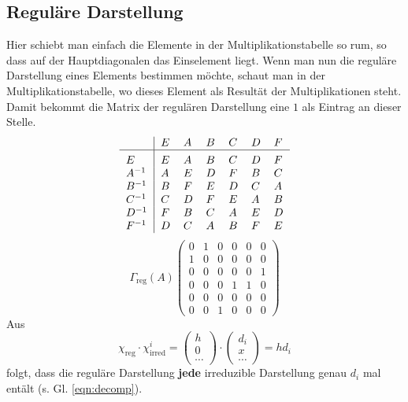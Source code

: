 \documentclass[
  captions=tableheading,  %
  titlepage=firstiscover, %
]{scrartcl}
\begin{document}
\subsection{Reguläre Darstellung}
Hier schiebt man einfach die Elemente in der Multiplikationstabelle so rum, so dass 
auf der Hauptdiagonalen das Einselement liegt. 
Wenn man nun die reguläre Darstellung eines Elements bestimmen möchte, schaut man in der 
Multiplikationstabelle, wo dieses Element als Resultät der Multiplikationen steht.
Damit bekommt die Matrix der regulären Darstellung eine $1$ als Eintrag an dieser Stelle.
\[
    \begin{tabular}{>{$}l<{$}|*{6}{>{$}l<{$}}}
    ~       & E   & A & B & C & D & F   \\
    \hline\vrule height 12pt width 0pt
    E       & E   & A & B & C & D & F\\
    A^{-1}  & A   & E & D & F & B & C\\
    B^{-1}  & B   & F & E & D & C & A\\
    C^{-1}  & C   & D & F & E & A & B\\
    D^{-1}  & F   & B & C & A & E & D\\
    F^{-1}  & D   & C & A & B & F & E\\
    \end{tabular} 
\]
\begin{equation*}
  \Gamma_\text{reg}(A)
  \begin{pmatrix}
    0 & 1 & 0 & 0 & 0 & 0 \\
    1 & 0 & 0 & 0 & 0 & 0 \\
    0 & 0 & 0 & 0 & 0 & 1 \\
    0 & 0 & 0 & 1 & 1 & 0 \\
    0 & 0 & 0 & 0 & 0 & 0 \\
    0 & 0 & 1 & 0 & 0 & 0 
  \end{pmatrix}
\end{equation*}
Aus \begin{equation*}
  \chi_\text{reg} \cdot \chi_\text{irred}^i = 
  \begin{pmatrix}
    h \\
    0 \\
    \cdots
  \end{pmatrix}
  \cdot 
  \begin{pmatrix}
    d_i \\
    x   \\
    \cdots
  \end{pmatrix}
  = h d_i 
\end{equation*}
folgt, dass die reguläre Darstellung \textbf{jede} irreduzible Darstellung genau $d_i$ mal entält (s. Gl. \eqref{eqn:decomp}).
\end{document}
